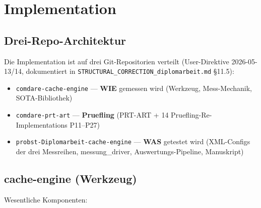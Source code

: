 \chapter{Implementation}\label{ch:implementation}


\section{Drei-Repo-Architektur}

Die Implementation ist auf drei Git-Repositorien verteilt
(User-Direktive 2026-05-13/14, dokumentiert in
\texttt{STRUCTURAL\_CORRECTION\_diplomarbeit.md} \S{}11.5):

\begin{itemize}
    \item \texttt{comdare-cache-engine} — \textbf{WIE} gemessen wird
          (Werkzeug, Mess-Mechanik, SOTA-Bibliothek)
    \item \texttt{comdare-prt-art} — \textbf{Pruefling} (PRT-ART
          + 14 Pruefling-Re-Implementations P11--P27)
    \item \texttt{probst-Diplomarbeit-cache-engine} — \textbf{WAS}
          getestet wird (XML-Configs der drei Messreihen, messung\_driver,
          Auswertungs-Pipeline, Manuskript)
\end{itemize}

\section{cache-engine (Werkzeug)}

Wesentliche Komponenten:

